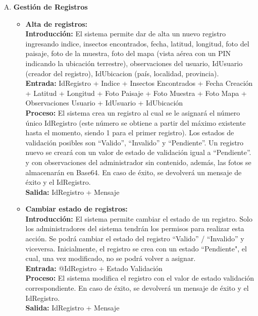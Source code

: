 \begin{enumerate}[A.]
      \item \textbf{Gestión de Registros}
        \begin{itemize}
          \item \textbf{Alta de registros:}
            \\ \textbf{Introducción:} El sistema permite dar de alta un nuevo registro ingresando indice, insectos encontrados, fecha, latitud, longitud, foto del paisaje, foto de la muestra, foto del mapa (vista aérea con un PIN indicando la ubicación terrestre), observaciones del usuario, IdUsuario (creador del registro), IdUbicacion (país, localidad, provincia).
            \\ \textbf{Entrada:} IdRegistro + Indice + Insectos Encontrados + Fecha Creación + Latitud + Longitud + Foto Paisaje + Foto Muestra + Foto Mapa + Observaciones Usuario + IdUsuario + IdUbicación
            \\ \textbf{Proceso:} El sistema crea un registro al cual se le asignará el número único IdRegistro (este número se obtiene a partir del máximo existente hasta el momento, siendo 1 para el primer registro). Los estados de validación posibles son ``Valido'', ``Invalido'' y ``Pendiente''. Un registro nuevo se creará con un valor de estado de validación igual a ``Pendiente''.  y con observaciones del administrador sin contenido, además, las fotos se almacenarán en Base64. En caso de éxito, se devolverá un mensaje de éxito y el IdRegistro.
            \\ \textbf{Salida:} IdRegistro + Mensaje
            \\
          \item \textbf{Cambiar estado de registros:}
            \\ \textbf{Introducción:} El sistema permite cambiar el estado de un registro. Solo los administradores del sistema tendrán los permisos para realizar esta acción. Se podrá cambiar el estado del registro ``Valido'' / ``Invalido'' y viceversa. Inicialmente, el registro se crea con un estado ``Pendiente", el cual, una vez modificado, no se podrá volver a asignar.
            \\ \textbf{Entrada:} @IdRegistro + Estado Validación
            \\ \textbf{Proceso:} El sistema modifica el registro con el valor de estado validación correspondiente. En caso de éxito, se devolverá un mensaje de éxito y el IdRegistro.
            \\ \textbf{Salida:} IdRegistro + Mensaje
            \\

\end{itemize}
\end{enumerate}
